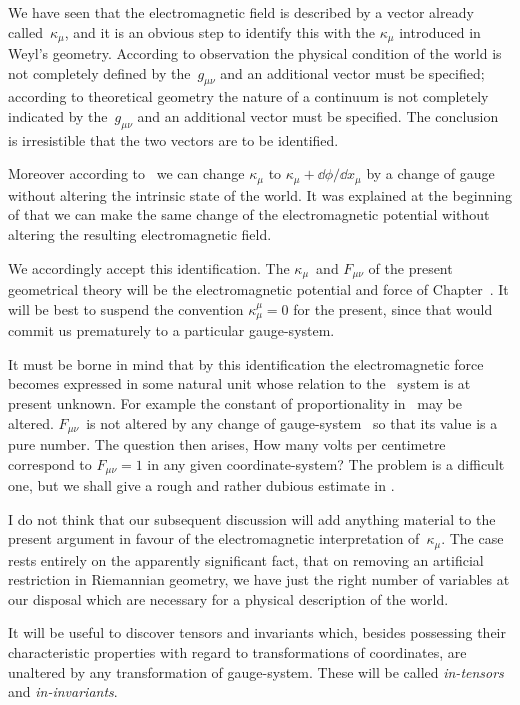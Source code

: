 \documentclass[12pt]{book}
\begin{document}
We have seen that the electromagnetic field is described by a vector already
called~$\kappa_{\mu}$, and it is an obvious step to identify this with the $\kappa_{\mu}$ introduced in
Weyl's geometry. According to observation the physical condition of the world
is not completely defined by the~$g_{\mu\nu}$ and an additional vector must be specified;
according to theoretical geometry the nature of a continuum is not completely
indicated by the~$g_{\mu\nu}$ and an additional vector must be specified. The conclusion
is irresistible that the two vectors are to be identified.

Moreover according to~ we can change $\kappa_{\mu}$ to $\kappa_{\mu} + \dd\phi/\dd x_{\mu}$ by a change
of gauge without altering the intrinsic state of the world. It was explained at
the beginning of  that we can make the same change of the electromagnetic
potential without altering the resulting electromagnetic field.

We accordingly accept this identification. The $\kappa_{\mu}$~and $F_{\mu\nu}$ of the present
geometrical theory will be the electromagnetic potential and force of Chapter~\@.
It will be best to suspend the convention $\kappa_{\mu}^{\mu} = 0$  for the present, since
that would commit us prematurely to a particular gauge\hyp{}system.

It must be borne in mind that by this identification the electromagnetic
force becomes expressed in some natural unit whose relation to the \CGS\
system is at present unknown. For example the constant of proportionality
in~\Eq{(77.7)} may be altered. $F_{\mu\nu}$~is not altered by any change of gauge\hyp{}system~
so that its value is a pure number. The question then arises, How many
volts per centimetre correspond to $F_{\mu\nu} = 1$ in any given coordinate\hyp{}system?
The problem is a difficult one, but we shall give a rough and rather dubious
estimate in \SecRef{102}.

I do not think that our subsequent discussion will add anything material
to the present argument in favour of the electromagnetic interpretation of~$\kappa_{\mu}$.
The case rests entirely on the apparently significant fact, that on removing an
artificial restriction in Riemannian geometry, we have just the right number
of variables at our disposal which are necessary for a physical description of
the world.

%

It will be useful to discover tensors and invariants which, besides possessing
their characteristic properties with regard to transformations of coordinates,
are unaltered by any transformation of gauge\hyp{}system. These will be called
\emph{in\hyp{}tensors} and \emph{in\hyp{}invariants}.
%
\end{document}
